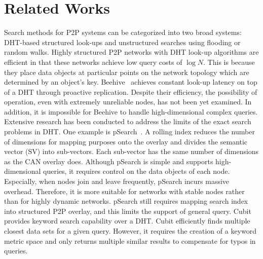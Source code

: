 \documentclass[9.5pt,journal,final,finalsubmission,twocolumn]{IEEEtran}
\begin{document}
\section{Related Works}
\label{sec:related_works}
Search methods for P2P systems can be categorized into two broad 
systems: DHT-based structured look-ups and unstructured searches using
flooding or random walks.
Highly structured P2P networks with DHT look-up algorithms 
\cite{is:Chord, CAN, bz:Tapestry, pr:Symphony} 
are efficient in that these networks achieve low query costs of 
$\log{N}$. This is because they place data objects at particular 
points on the network topology
which are determined by an object's key. Beehive~\cite{re:beehive04} 
achieves constant look-up latency on top of a
DHT through proactive replication. Despite their efficiency, the possibility 
of operation, even with extremely unreliable nodes, has not been yet
examined. In addition, it is impossible for Beehive to handle
high-dimensional complex queries.  Extensive research has been conducted 
to address the limits of the exact search problems in DHT.
One example is pSearch~\cite{psearch}.
A rolling index reduces the number of dimensions for mapping purposes 
onto the overlay and divides the semantic vector (SV) into sub-vectors. 
Each sub-vector has the same number of dimensions as the CAN overlay does.
Although pSearch is simple and supports high-dimensional queries, 
it requires control on the data objects of each node. Especially, when 
nodes join and leave frequently, pSearch incurs massive overhead.
Therefore, it is more suitable for networks with stable nodes rather than
for highly dynamic networks.
pSearch still requires mapping search index into structured P2P overlay, and
this limits the support of general query.
Cubit~\cite{cubit} provides keyword search capability over a DHT. Cubit 
efficiently finds multiple closest data sets for a given query. However, 
it requires the creation of a keyword metric space and only returns multiple similar results
to compensate for typos in queries. 
\end{document}
